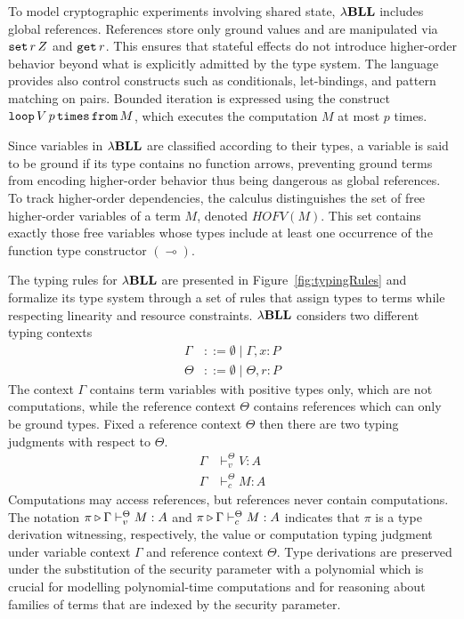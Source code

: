 To model cryptographic experiments involving shared state, ${\lambda}\mathbf{BLL}$ includes global references. References store only ground values and are manipulated via $\mathtt{set}\,r\, Z$ and $\mathtt{get}\, r$. This ensures that stateful effects do not introduce higher-order behavior beyond what is explicitly admitted by the type system. The language provides also control constructs such as conditionals, let-bindings, and pattern matching on pairs. Bounded iteration is expressed using the construct $\mathtt{loop}\,V\,p\,\mathtt{times \, from}\, M$, which executes the computation $M$ at most $p$ times.

Since variables in ${\lambda}\mathbf{BLL}$ are classified according to their types, a variable is said to be ground if its type contains no function arrows, preventing ground terms from encoding higher-order behavior thus being dangerous as global references. To track higher-order dependencies, the calculus distinguishes the set of free higher-order variables of a term $M$, denoted $\mathit{HOFV}(M)$. This set contains exactly those free variables whose types include at least one occurrence of the function type constructor $(\multimap)$.

The typing rules for ${\lambda}\mathbf{BLL}$ are presented in Figure~\ref{fig:typingRules} and formalize its type system through a set of rules that assign types to terms while respecting linearity and resource constraints. ${\lambda}\mathbf{BLL}$ considers two different typing contexts
\begin{align*}
\Gamma &::= \emptyset \mid \Gamma, x: P \tag{Variable context} \\
\Theta &::= \emptyset \mid \Theta, r: P \tag{Reference context}
\end{align*}
The context $\Gamma$ contains term variables with positive types only, which are not computations, while the reference context $\Theta$ contains references which can only be ground types. Fixed a reference context $\Theta$ then there are two typing judgments with respect to $\Theta$.
\begin{align*}
\Gamma &\vdash_v^\Theta V: A \tag{Value typing} \\
\Gamma &\vdash_c^\Theta M: A \tag{Computation typing}
\end{align*}
Computations may access references, but references never contain computations. The notation $\pi \triangleright \Gamma \vdash^\Theta_v M:A$ and $\pi \triangleright \Gamma \vdash^\Theta_c M:A$ indicates that $\pi$ is a type derivation witnessing, respectively, the value or computation typing judgment under variable context $\Gamma$ and reference context $\Theta$. Type derivations are preserved under the substitution of the security parameter with a polynomial which is crucial for modelling polynomial-time computations and for reasoning about families of terms that are indexed by the security parameter.

